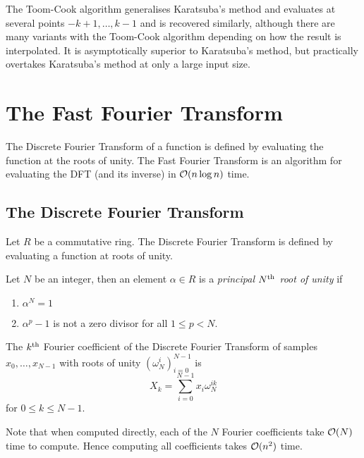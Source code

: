 The Toom-Cook algorithm generalises Karatsuba's method and evaluates at several points $-k + 1, \ldots, k - 1$ and is recovered similarly, although there are many variants with the Toom-Cook algorithm depending on how the result is interpolated. It is asymptotically superior to Karatsuba's method, but practically overtakes Karatsuba's method at only a large input size.

\section{The Fast Fourier Transform}

The Discrete Fourier Transform of a function is defined by evaluating the function at the roots of unity. The Fast Fourier Transform is an algorithm for evaluating the DFT (and its inverse) in $\mathcal O(n \log n)$ time.

\subsection{The Discrete Fourier Transform}

Let $R$ be a commutative ring. The Discrete Fourier Transform is defined by evaluating a function at roots of unity.

\begin{definition}
  Let $N$ be an integer, then an element $\alpha \in R$ is a \emph{principal $N^{\textrm{th}}$ root of unity} if
  \begin{enumerate}
    \item $\alpha^N = 1$
    \item $\alpha^p - 1$ is not a zero divisor for all $1 \leq p < N$.
  \end{enumerate}
\end{definition}


\begin{definition}
    The $k^{\textrm{th}}$ Fourier coefficient of the Discrete Fourier Transform of samples $x_0, \ldots, x_{N-1}$ with roots of unity $(\omega_N^i)_{i=0}^{N-1}$ is
\[
    X_k = \sum^{N-1}_{i=0}x_i\omega_{N}^{ik}
\]
for $0 \leq k \leq N-1$.
\end{definition}

Note that when computed directly, each of the $N$ Fourier coefficients take $\mathcal O(N)$ time to compute. Hence computing all coefficients takes $\mathcal O(n^2)$ time.


